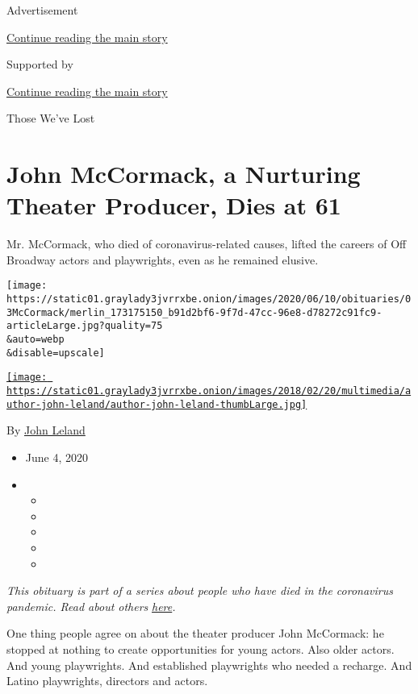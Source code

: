 Advertisement

\protect\hyperlink{after-top}{Continue reading the main story}

Supported by

\protect\hyperlink{after-sponsor}{Continue reading the main story}

Those We've Lost

\hypertarget{john-mccormack-a-nurturing-theater-producer-dies-at-61}{%
\section{John McCormack, a Nurturing Theater Producer, Dies at
61}\label{john-mccormack-a-nurturing-theater-producer-dies-at-61}}

Mr. McCormack, who died of coronavirus-related causes, lifted the
careers of Off Broadway actors and playwrights, even as he remained
elusive.

\texttt{[image: https://static01.graylady3jvrrxbe.onion/images/2020/06/10/obituaries/03McCormack/merlin\_173175150\_b91d2bf6-9f7d-47cc-96e8-d78272c91fc9-articleLarge.jpg?quality=75\\\&auto=webp\\\&disable=upscale]}

\href{https://www.nytimes3xbfgragh.onion/by/john-leland}{\texttt{[image: https://static01.graylady3jvrrxbe.onion/images/2018/02/20/multimedia/author-john-leland/author-john-leland-thumbLarge.jpg]}}

By \href{https://www.nytimes3xbfgragh.onion/by/john-leland}{John Leland}

\begin{itemize}
\item
  June 4, 2020
\item
  \begin{itemize}
  \item
  \item
  \item
  \item
  \item
  \end{itemize}
\end{itemize}

\emph{This obituary is part of a series about people who have died in
the coronavirus pandemic. Read about others}
\href{https://www.nytimes3xbfgragh.onion/interactive/2020/obituaries/people-died-coronavirus-obituaries.html}{\emph{here}}\emph{.}

One thing people agree on about the theater producer John McCormack: he
stopped at nothing to create opportunities for young actors. Also older
actors. And young playwrights. And established playwrights who needed a
recharge. And Latino playwrights, directors and actors.

